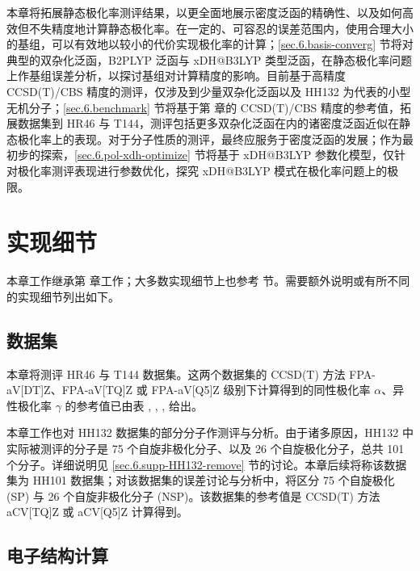 本章将拓展静态极化率测评结果，以更全面地展示密度泛函的精确性、以及如何高效但不失精度地计算静态极化率。在一定的、可容忍的误差范围内，使用合理大小的基组，可以有效地以较小的代价实现极化率的计算；\ref{sec.6.basis-converg} 节将对典型的双杂化泛函，B2PLYP 泛函与 xDH@B3LYP 类型泛函，在静态极化率问题上作基组误差分析，以探讨基组对计算精度的影响。目前基于高精度 CCSD(T)/CBS 精度的测评，仅涉及到少量双杂化泛函以及 HH132\cite{Hait-Head-Gordon.PCCP.2018} 为代表的小型无机分子；\ref{sec.6.benchmark} 节将基于第  章的 CCSD(T)/CBS 精度的参考值，拓展数据集到 HR46\cite{Hickey-Rowley.JPCA.2014} 与 T144\cite{Wu-Thakkar.CPL.2015}，测评包括更多双杂化泛函在内的诸密度泛函近似在静态极化率上的表现。对于分子性质的测评，最终应服务于密度泛函的发展；作为最初步的探索，\ref{sec.6.pol-xdh-optimize} 节将基于 xDH@B3LYP 参数化模型\cite{Zhang-Xu.JPCL.2021}，仅针对极化率测评表现进行参数优化，探究 xDH@B3LYP 模式在极化率问题上的极限。

\section{实现细节}

本章工作继承第  章工作；大多数实现细节上也参考  节。需要额外说明或有所不同的实现细节列出如下。

\subsection{数据集}

本章将测评 HR46\cite{Hickey-Rowley.JPCA.2014} 与 T144\cite{Wu-Thakkar.CPL.2015} 数据集。这两个数据集的 CCSD(T) 方法 FPA-aV[DT]Z、FPA-aV[TQ]Z 或 FPA-aV[Q5]Z 级别下计算得到的同性极化率 $\alpha$、异性极化率 $\gamma$ 的参考值已由表 , , ,  给出。

本章工作也对 HH132 数据集\cite{Hait-Head-Gordon.PCCP.2018}的部分分子作测评与分析。由于诸多原因，HH132 中实际被测评的分子是 75 个自旋非极化分子、以及 26 个自旋极化分子，总共 101 个分子。详细说明见 \ref{sec.6.supp-HH132-remove} 节的讨论。本章后续将称该数据集为 HH101 数据集；对该数据集的误差讨论与分析中，将区分 75 个自旋极化 (SP) 与 26 个自旋非极化分子 (NSP)。该数据集的参考值是 CCSD(T) 方法 aCV[TQ]Z 或 aCV[Q5]Z 计算得到。

\subsection{电子结构计算}

